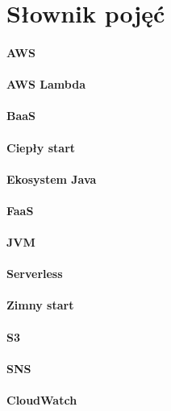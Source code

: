 \chapter*{Słownik pojęć}

\subsubsection*{AWS}

\subsubsection*{AWS Lambda}

\subsubsection*{BaaS}

\subsubsection*{Ciepły start}

\subsubsection*{Ekosystem Java}

\subsubsection*{FaaS}

\subsubsection*{JVM}

\subsubsection*{Serverless}

\subsubsection*{Zimny start}

\subsubsection*{S3}

\subsubsection*{SNS}

\subsubsection*{CloudWatch}
